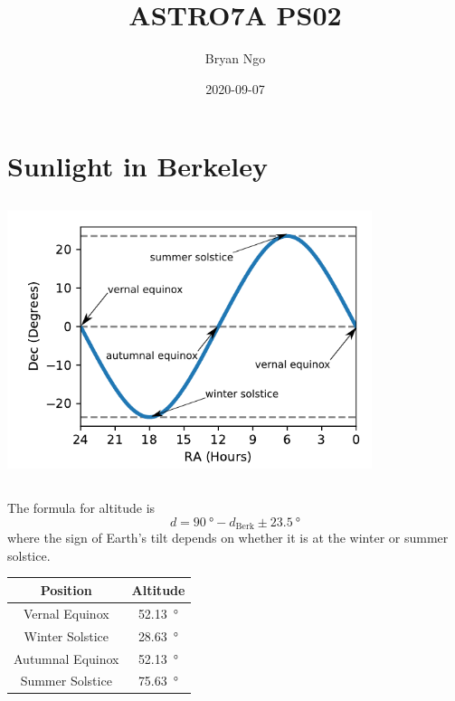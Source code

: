 \documentclass{article}
\title{ASTRO7A PS02}
\author{Bryan Ngo}
\date{2020-09-07}
\begin{document}
\maketitle

\section{Sunlight in Berkeley}

\subsection{}

\begin{center}
    \includegraphics[width=0.8\textwidth]{q1a.png}
\end{center}

\subsection{}

The formula for altitude is
\begin{equation}
    d = \SI{90}{\degree} - d_{\text{Berk}} \pm \SI{23.5}{\degree}
\end{equation}
where the sign of Earth's tilt depends on whether it is at the winter or summer solstice.
\begin{center}
    \begin{tabular}{||c|c||}
        \hline
        Position & Altitude \\
        \hline
        Vernal Equinox & \SI{52.13}{\degree} \\
        Winter Solstice & \SI{28.63}{\degree} \\
        Autumnal Equinox & \SI{52.13}{\degree} \\
        Summer Solstice & \SI{75.63}{\degree} \\
        \hline
    \end{tabular}
\end{center}
\end{document}
